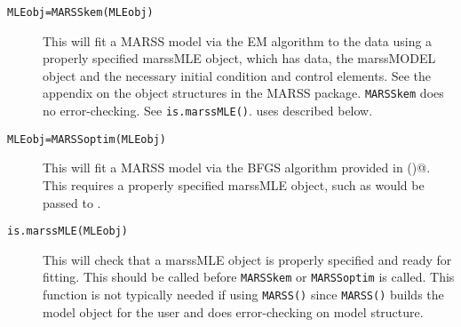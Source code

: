 \begin{description}
	\item[\texttt{MLEobj=MARSSkem(MLEobj)}] This will fit a MARSS model via the EM algorithm to the data using a properly specified marssMLE object, which has data, the marssMODEL object and the necessary initial condition and control elements.  See the appendix on the object structures in the MARSS package.  \texttt{MARSSkem}	does no error-checking.  See \texttt{is.marssMLE()}. \verb@MARSSkem@ uses \verb@MARSSkf@ described below.  
	\item[\texttt{MLEobj=MARSSoptim(MLEobj)}] This will fit a MARSS model via the BFGS algorithm provided in \verb@optim()@. This requires a properly specified marssMLE object, such as would be passed to \verb@MARSSkem@. 
	\item[\texttt{is.marssMLE(MLEobj)}] This will check that a marssMLE object is properly specified and ready for fitting.  This should be called before \texttt{MARSSkem} or \texttt{MARSSoptim} is called.  This function is not typically needed if using \texttt{MARSS()} since \texttt{MARSS()} builds the model object for the user and does error-checking on model structure.
\end{description}

